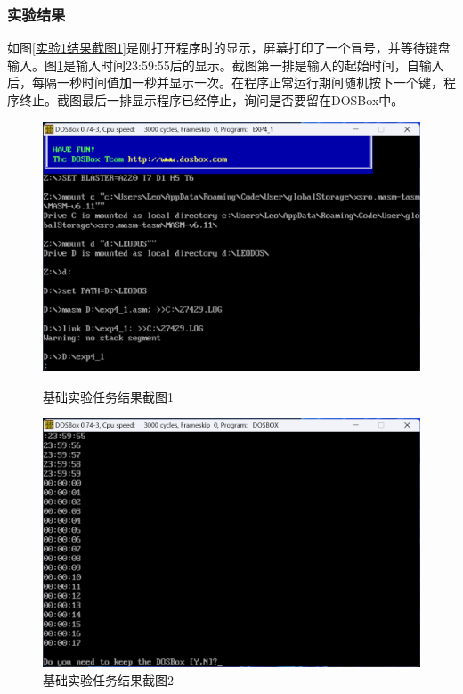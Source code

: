 \documentclass[12pt, a4paper, oneside]{ctexart}
\begin{document}
\subsubsection{实验结果}
如图\ref{实验1结果截图1}是刚打开程序时的显示，屏幕打印了一个冒号，并等待键盘输入。图\ref{实验1结果截图2}是输入时间23:59:55后的显示。截图第一排是输入的起始时间，自输入后，每隔一秒时间值加一秒并显示一次。在程序正常运行期间随机按下一个键，程序终止。截图最后一排显示程序已经停止，询问是否要留在DOSBox中。
\begin{figure}[H]
    \centering
    \begin{minipage}{0.45\textwidth}
    \centering
    \includegraphics[scale=0.48]{pic/exp4-1-colon.png}
    \caption{基础实验任务结果截图1}
    \label{实验1结果截图1}
    \end{minipage}
    \hspace{0.05\textwidth}
    \begin{minipage}{0.45\textwidth}
    \centering
    \includegraphics[scale=0.48]{pic/exp4-1-presskey.png}
    \caption{基础实验任务结果截图2}
    \label{实验1结果截图2}
    \end{minipage}
\end{figure}
\end{document}
